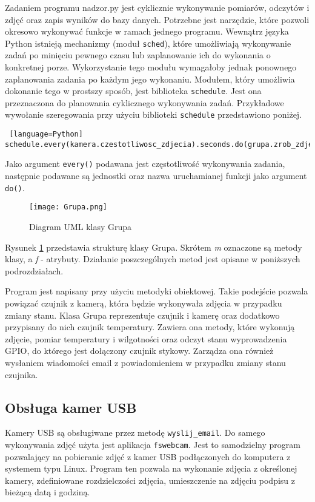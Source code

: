 \documentclass[a4paper,12pt,twoside]{article}
\begin{document}
Zadaniem programu nadzor.py jest cyklicznie wykonywanie pomiarów, odczytów i zdjęć oraz zapis wyników do bazy danych. Potrzebne jest narzędzie, które pozwoli okresowo wykonywać funkcje w ramach jednego programu. Wewnątrz języka Python istnieją mechanizmy (moduł \texttt{sched}), które umożliwiają wykonywanie zadań po minięciu pewnego czasu lub zaplanowanie ich do wykonania o konkretnej porze. Wykorzystanie tego modułu wymagałoby jednak ponownego zaplanowania zadania po każdym jego wykonaniu. Modułem, który umożliwia dokonanie tego w prostszy sposób, jest biblioteka \texttt{schedule}. Jest ona przeznaczona do planowania cyklicznego wykonywania zadań. Przykładowe wywołanie szeregowania przy użyciu biblioteki \texttt{schedule} przedstawiono poniżej.
\begin{lstlisting} [language=Python]
schedule.every(kamera.czestotliwosc_zdjecia).seconds.do(grupa.zrob_zdjecie)
\end{lstlisting}
Jako argument \texttt{every()} podawana jest częstotliwość wykonywania zadania, następnie podawane są jednostki oraz nazwa uruchamianej funkcji jako argument \texttt{do()}.

\begin{figure}[H]
\begin{center}
\texttt{[image: Grupa.png]}
\caption{Diagram UML klasy Grupa}
\label{fig: Grupa}
\end{center}
\end{figure}

Rysunek \ref{fig: Grupa} przedstawia strukturę klasy Grupa. Skrótem \textit{m} oznaczone są metody klasy, a \textit{f} - atrybuty. Działanie poszczególnych metod jest opisane w poniższych podrozdziałach. 

Program jest napisany przy użyciu metodyki obiektowej. Takie podejście pozwala powiązać czujnik z kamerą, która będzie wykonywała zdjęcia w przypadku zmiany stanu. Klasa Grupa reprezentuje czujnik i kamerę oraz dodatkowo przypisany do nich czujnik temperatury. Zawiera ona metody, które wykonują zdjęcie, pomiar temperatury i wilgotności oraz odczyt stanu wyprowadzenia GPIO, do którego jest dołączony czujnik stykowy. Zarządza ona również wysłaniem wiadomości email z powiadomieniem w przypadku zmiany stanu czujnika.

\subsection{Obsługa kamer USB}
Kamery USB są obsługiwane przez metodę \texttt{wyslij{\_}email}. Do samego wykonywania zdjęć użyta jest aplikacja \texttt{fswebcam}. Jest to samodzielny program pozwalający na pobieranie zdjęć z kamer USB podłączonych do komputera z systemem typu Linux. Program ten pozwala na wykonanie zdjęcia z określonej kamery, zdefiniowane rozdzielczości zdjęcia, umieszczenie na zdjęciu podpisu z bieżącą datą i godziną. 
\end{document}
